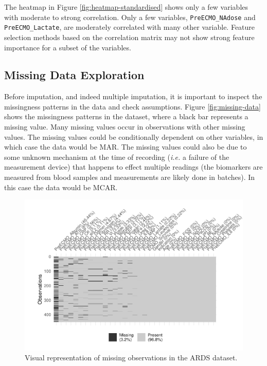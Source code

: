\documentclass[12pt,]{article}
\begin{document}
The heatmap in Figure \ref{fig:heatmap-standardised} shows only a few
variables with moderate to strong correlation. Only a few variables,
\texttt{PreECMO\_NAdose} and \texttt{PreECMO\_Lactate}, are moderately
correlated with many other variable. Feature selection methods based on
the correlation matrix may not show strong feature importance for a
subset of the variables.

\subsection{Missing Data Exploration}\label{missing-data-exploration}

Before imputation, and indeed multiple imputation, it is important to
inspect the missingness patterns in the data and check assumptions.
Figure \ref{fig:missing-data} shows the missingness patterns in the
dataset, where a black bar represents a missing value. Many missing
values occur in observations with other missing values. The missing
values could be conditionally dependent on other variables, in which
case the data would be MAR. The missing values could also be due to some
unknown mechanism at the time of recording (\emph{i.e.} a failure of the
measurement device) that happens to effect multiple readings (the
biomarkers are measured from blood samples and measurements are likely
done in batches). In this case the data would be MCAR.

\begin{figure}[H]

{\centering \includegraphics[width=1\linewidth]{figure/graphics-unnamed-chunk-4-1} 

}

\caption{\label{fig:missing-data}Visual representation of missing observations in the ARDS dataset.}\label{fig:unnamed-chunk-4}
\end{figure}
\end{document}
